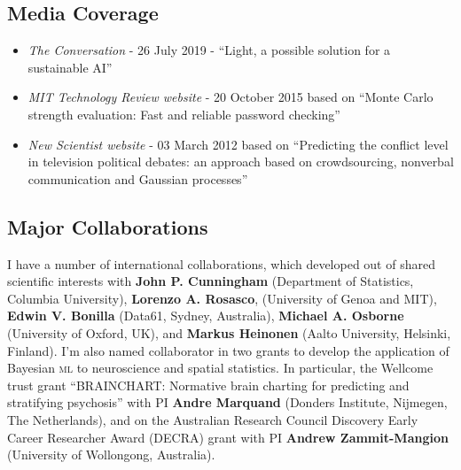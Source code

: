 \documentclass[a4paper,10pt]{article}
\newcommand{\ml}{\name{ml}}
\newcommand{\name}[1]{{\textsc{#1}}\xspace}
\begin{document}
\subsection*{Media Coverage}



\begin{itemize}
\item {\em The Conversation} - 26 July 2019 - ``Light, a possible solution for a sustainable AI''
\item {\em MIT Technology Review website} - 20 October 2015 based on ``Monte Carlo strength evaluation: Fast and reliable password checking''
\item {\em New Scientist website} - 03 March 2012 based on ``Predicting the conflict level in television political debates: an approach based on crowdsourcing, nonverbal communication and Gaussian processes''
\end{itemize}

\subsection*{Major Collaborations}

I have a number of international collaborations, which developed out of shared scientific interests with {\bf John P. Cunningham} (Department of Statistics, Columbia University), {\bf Lorenzo A. Rosasco}, (University of Genoa and MIT), {\bf Edwin V. Bonilla} (Data61, Sydney, Australia), {\bf Michael A. Osborne} (University of Oxford, UK), and {\bf Markus Heinonen} (Aalto University, Helsinki, Finland).
I'm also named collaborator in two grants to develop the application of Bayesian \ml to neuroscience and spatial statistics. 
In particular, the Wellcome trust grant ``BRAINCHART: Normative brain charting for predicting and stratifying psychosis'' with PI {\bf Andre Marquand} (Donders Institute, Nijmegen, The Netherlands), and on the Australian Research Council Discovery Early Career Researcher Award (DECRA) grant with PI {\bf Andrew Zammit-Mangion} (University of Wollongong, Australia).
\end{document}
